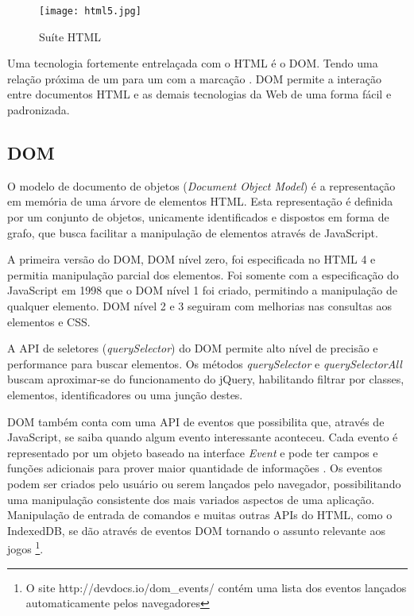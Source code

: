 \begin{figure}[H]
    \centering
    \texttt{[image: html5.jpg]}
    \caption{Suíte HTML}
\end{figure}

Uma tecnologia fortemente entrelaçada com o HTML é o DOM.
Tendo uma relação próxima de um para um com a marcação
\autocite{howBrowsersWork}. DOM permite a interação entre documentos
HTML e as demais tecnologias da Web de uma forma fácil e padronizada.

\subsection{DOM}

O modelo de documento de objetos (\textit{Document Object Model}) é
a representação em memória de uma árvore de elementos HTML. Esta
representação é definida por um conjunto de objetos, unicamente
identificados e dispostos em forma de grafo, que busca facilitar a
manipulação de elementos através de JavaScript.

A primeira versão do DOM, DOM nível zero, foi especificada no
HTML 4 e permitia manipulação parcial dos elementos. Foi somente
com a especificação do JavaScript em 1998 que o DOM nível 1 foi
criado, permitindo a manipulação de qualquer elemento. DOM
nível 2 e 3 seguiram com melhorias nas consultas aos elementos e CSS.

A API de seletores (\textit{querySelector}) do DOM permite alto
nível de precisão e performance para buscar elementos. Os métodos
\textit{querySelector} e \textit{querySelectorAll} buscam aproximar-se
do funcionamento do jQuery, habilitando filtrar por classes, elementos,
identificadores ou uma junção destes.

DOM também conta com uma API de eventos que possibilita que, através
de JavaScript, se saiba quando algum evento interessante aconteceu.
Cada evento é representado por um objeto baseado na interface
\textit{Event} e pode ter campos e funções adicionais para prover
maior quantidade de informações \autocite{devdocs}. Os eventos
podem ser criados pelo usuário ou serem lançados pelo navegador,
possibilitando uma manipulação consistente dos mais variados
aspectos de uma aplicação. Manipulação de entrada de comandos e
muitas outras APIs do HTML, como o IndexedDB, se dão através
de eventos DOM tornando o assunto relevante aos jogos \footnote{O site
http://devdocs.io/dom\_events/ contém uma lista dos eventos lançados
automaticamente pelos navegadores}.

